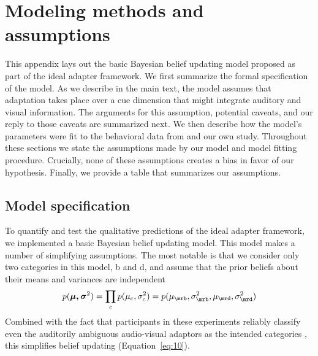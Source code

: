 \appendix

\section{Modeling methods and assumptions}
\label{sec:appendix}

This appendix lays out the basic Bayesian belief updating model proposed as part of the ideal adapter framework. %
We first summarize the formal specification of the model. As we describe in the main text, the model assumes that adaptation takes place over a cue dimension that might integrate auditory and visual information. The arguments for this assumption, potential caveats, and our reply to those caveats are summarized
next. We then %
describe how the model's parameters were fit to the behavioral data from  and our own study. Throughout these sections we state the assumptions made by our model and model fitting procedure. Crucially, none of these assumptions creates a bias in favor of our hypothesis. Finally, we provide a table that summarizes our assumptions.

\subsection{Model specification}
\label{sec:model-fitting-methods}

To quantify and test the qualitative predictions of the ideal adapter framework, we implemented a basic Bayesian belief updating model.  This model makes a number of simplifying assumptions. The most notable is that we consider only two categories in this model, \ph b and \ph d, and assume that the prior beliefs about their means and variances are independent
\begin{equation}
  \label{eq:21}
  p(\boldsymbol{\mu, \sigma}^2) = \prod_c p(\mu_c, \sigma^2_c) = p(\mu_\mrb, \sigma^2_\mrb, \mu_\mrd, \sigma^2_\mrd)
\end{equation}
Combined with the fact that participants in these experiments reliably classify even the auditorily ambiguous audio-visual adaptors as the intended categories \cite{Vroomen2004}, this simplifies belief updating (Equation~\ref{eq:10}).

